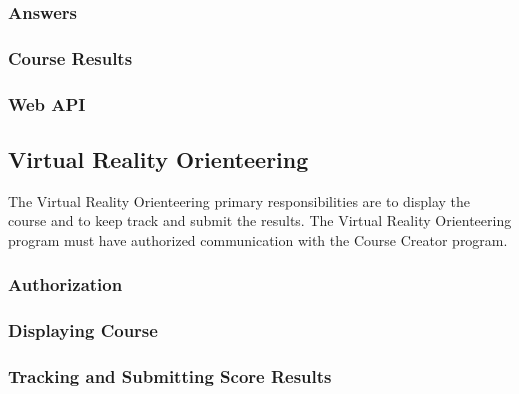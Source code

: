 \subsubsection{Answers}

\subsubsection{Course Results}

\subsubsection{Web API}

\subsection{Virtual Reality Orienteering}
The Virtual Reality Orienteering primary responsibilities are to display the course and to keep track and submit the results. The Virtual Reality Orienteering program must have authorized communication with the Course Creator program.

\subsubsection{Authorization}

\subsubsection{Displaying Course}

\subsubsection{Tracking and Submitting Score Results}

